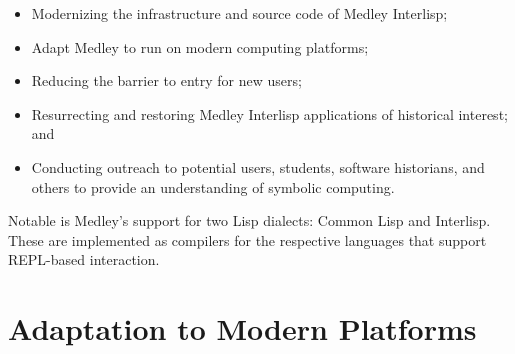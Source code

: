 \documentclass[sigconf]{acmart}
\begin{document}
\begin{itemize}
  \item Modernizing the infrastructure and source code of Medley Interlisp;

  \item Adapt Medley to run on modern computing platforms;

  \item Reducing the barrier to entry for new users; 

  \item Resurrecting and restoring Medley Interlisp applications of historical interest; and

  \item Conducting outreach to potential users, students, software historians, and others to provide an understanding of symbolic computing.
\end{itemize}

Notable is Medley's support for two Lisp dialects: Common Lisp and Interlisp. These are implemented as compilers for the respective languages that support REPL-based interaction.









\section{Adaptation to Modern Platforms}
\end{document}
